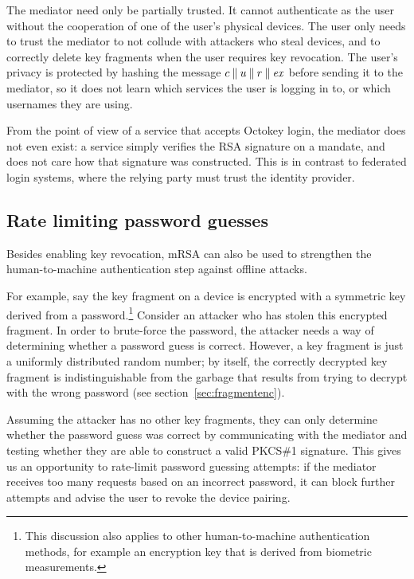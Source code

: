 The mediator need only be partially trusted. It cannot authenticate as the user without the
cooperation of one of the user's physical devices. The user only needs to trust the mediator to not
collude with attackers who steal devices, and to correctly delete key fragments when the user
requires key revocation. The user's privacy is protected by hashing the message
$c \mathbin{\|} u \mathbin{\|} r \mathbin{\|} \mathit{ex}$ before sending it to the mediator, so it does not learn
which services the user is logging in to, or which usernames they are using.

From the point of view of a service that accepts Octokey login, the mediator does not even exist: a
service simply verifies the RSA signature on a mandate, and does not care how that signature was
constructed. This is in contrast to federated login systems, where the relying party must trust the
identity provider.

\subsection{Rate limiting password guesses}\label{sec:ratelimit}

Besides enabling key revocation, mRSA can also be used to strengthen the human-to-machine
authentication step against offline attacks.

For example, say the key fragment on a device is encrypted with a symmetric key derived from a
password.\footnote{This discussion also applies to other human-to-machine authentication methods,
for example an encryption key that is derived from biometric measurements.} Consider an attacker who
has stolen this encrypted fragment. In order to brute-force the password, the attacker needs a way
of determining whether a password guess is correct. However, a key fragment is just a uniformly
distributed random number; by itself, the correctly decrypted key fragment is indistinguishable from
the garbage that results from trying to decrypt with the wrong password (see
section~\ref{sec:fragmentenc}).

Assuming the attacker has no other key fragments, they can only determine whether the password guess
was correct by communicating with the mediator and testing whether they are able to construct a
valid PKCS\#1 signature. This gives us an opportunity to rate-limit password guessing attempts: if
the mediator receives too many requests based on an incorrect password, it can block further
attempts and advise the user to revoke the device pairing.

